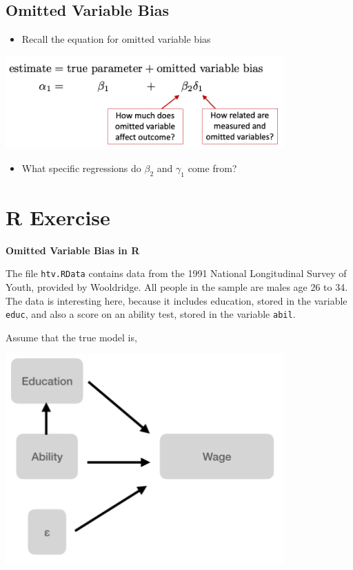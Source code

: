 \documentclass[
]{book}
\providecommand{\tightlist}{%
  \setlength{\itemsep}{0pt}\setlength{\parskip}{0pt}}
\theoremstyle{definition}
\theoremstyle{definition}
\theoremstyle{definition}
\theoremstyle{definition}
\theoremstyle{remark}
\begin{document}
\hypertarget{omitted-variable-bias}{%
\subsection{Omitted Variable Bias}\label{omitted-variable-bias}}

\begin{itemize}
\tightlist
\item
  Recall the equation for omitted variable bias
\end{itemize}

\includegraphics[width=0.8\textwidth,height=\textheight]{images/ovb.png}

\begin{itemize}
\tightlist
\item
  What specific regressions do \(\beta_2\) and \(\gamma_1\) come from?
\end{itemize}

\hypertarget{r-exercise-2}{%
\section{R Exercise}\label{r-exercise-2}}

\textbf{Omitted Variable Bias in R}

The file \texttt{htv.RData} contains data from the 1991 National Longitudinal Survey of Youth, provided by Wooldridge. All people in the sample are males age 26 to 34. The data is interesting here, because it includes education, stored in the variable \texttt{educ}, and also a score on an ability test, stored in the variable \texttt{abil}.

Assume that the true model is,

\includegraphics[width=0.8\textwidth,height=\textheight]{images/wage_system.png}
\end{document}
